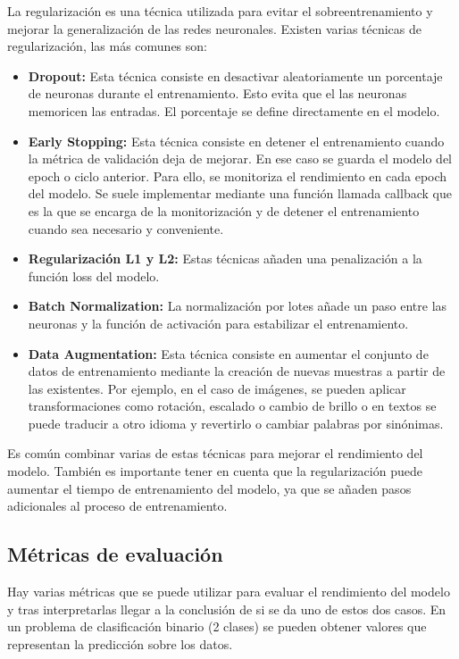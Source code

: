 La regularización es una técnica utilizada para evitar el sobreentrenamiento y mejorar la generalización de las redes neuronales.
Existen varias técnicas de regularización\cite{medium:regularizacion}, las más comunes son:
\begin{itemize}
	\item \textbf{Dropout:} Esta técnica consiste en desactivar aleatoriamente un porcentaje de neuronas durante el entrenamiento. Esto evita que el las neuronas memoricen las entradas. El porcentaje se define directamente en el modelo.
	\item \textbf{Early Stopping:} Esta técnica consiste en detener el entrenamiento cuando la métrica de validación deja de mejorar. En ese caso se guarda el modelo del epoch o ciclo anterior. Para ello, se monitoriza el rendimiento en cada epoch del modelo. Se suele implementar mediante una función llamada callback que es la que se encarga de la monitorización y de detener el entrenamiento cuando sea necesario y conveniente.
	\item \textbf{Regularización L1 y L2:} Estas técnicas añaden una penalización a la función loss del modelo.
	\item \textbf{Batch Normalization:} La normalización por lotes añade un paso entre las neuronas y la función de activación para estabilizar el entrenamiento.
	\item \textbf{Data Augmentation:} Esta técnica consiste en aumentar el conjunto de datos de entrenamiento mediante la creación de nuevas muestras a partir de las existentes. Por ejemplo, en el caso de imágenes, se pueden aplicar transformaciones como rotación, escalado o cambio de brillo o en textos se puede traducir a otro idioma y revertirlo o cambiar palabras por sinónimas.
\end{itemize}

Es común combinar varias de estas técnicas para mejorar el rendimiento del modelo. 
También es importante tener en cuenta que la regularización puede aumentar el tiempo de entrenamiento del modelo, ya que se añaden pasos adicionales al proceso de entrenamiento.

\subsection{Métricas de evaluación}

Hay varias métricas\cite{clasificacion} que se puede utilizar para evaluar el rendimiento del modelo y tras interpretarlas llegar a la conclusión de si se da uno de estos dos casos.
En un problema de clasificación binario (2 clases) se pueden obtener valores que representan la predicción sobre los datos.

